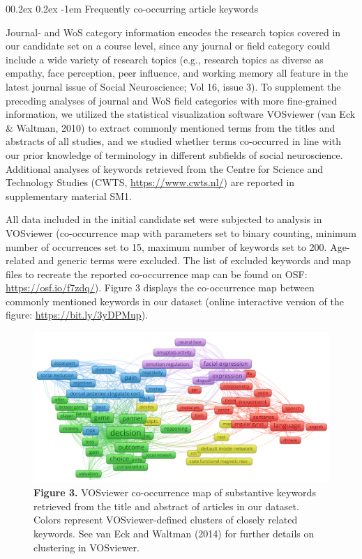 \documentclass[
  man,floatsintext]{apa6}
\makeatletter
\let\oldparagraph\paragraph
\renewcommand{\paragraph}[1]{\oldparagraph{#1}\mbox{}}
\renewcommand{\paragraph}{\@startsection{paragraph}{4}{\parindent}%
  {0\baselineskip \@plus 0.2ex \@minus 0.2ex}%
  {-1em}%
  {\normalfont\normalsize\bfseries\itshape\typesectitle}}
\makeatother
\begin{document}
\hypertarget{frequently-co-occurring-article-keywords}{%
\paragraph{Frequently co-occurring article keywords}\label{frequently-co-occurring-article-keywords}}

Journal- and WoS category information encodes the research topics covered in our candidate set on a course level, since any journal or field category could include a wide variety of research topics (e.g., research topics as diverse as empathy, face perception, peer influence, and working memory all feature in the latest journal issue of Social Neuroscience; Vol 16, issue 3). To supplement the preceding analyses of journal and WoS field categories with more fine-grained information, we utilized the statistical visualization software VOSviewer (van Eck \& Waltman, 2010) to extract commonly mentioned terms from the titles and abstracts of all studies, and we studied whether terms co-occurred in line with our prior knowledge of terminology in different subfields of social neuroscience. Additional analyses of keywords retrieved from the Centre for Science and Technology Studies (CWTS, \url{https://www.cwts.nl/}) are reported in supplementary material SM1.

All data included in the initial candidate set were subjected to analysis in VOSviewer (co-occurrence map with parameters set to binary counting, minimum number of occurrences set to 15, maximum number of keywords set to 200. Age-related and generic terms were excluded. The list of excluded keywords and map files to recreate the reported co-occurrence map can be found on OSF: \url{https://osf.io/f7zdq/}). Figure 3 displays the co-occurrence map between commonly mentioned keywords in our dataset (online interactive version of the figure: \url{https://bit.ly/3yDPMup}).

\begin{figure}
\centering
\includegraphics{vosviewer_label_cooccurence.png}
\caption{\textbf{Figure 3.} VOSviewer co-occurrence map of substantive keywords retrieved from the title and abstract of articles in our dataset. Colors represent VOSviewer-defined clusters of closely related keywords. See van Eck and Waltman (2014) for further details on clustering in VOSviewer.}
\end{figure}
\end{document}
